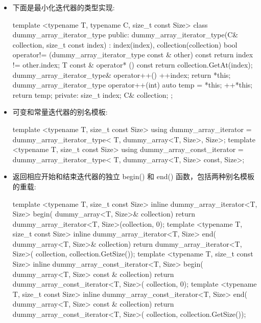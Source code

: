 \begin{itemize}
\item
下面是最小化迭代器的类型实现:

\begin{cpp}
template <typename T, typename C, size_t const Size>
class dummy_array_iterator_type
{
    public:
    dummy_array_iterator_type(C& collection,
    size_t const index) :
    index(index), collection(collection)
    { }
    bool operator!= (dummy_array_iterator_type const & other) const
    {
        return index != other.index;
    }
    T const & operator* () const
    {
        return collection.GetAt(index);
    }
    dummy_array_iterator_type& operator++()
    {
        ++index;
        return *this;
    }
    dummy_array_iterator_type operator++(int)
    {
        auto temp = *this;
        ++*this;
        return temp;
    }
    private:
    size_t   index;
    C&       collection;
};
\end{cpp}

\item
可变和常量迭代器的别名模板:

\begin{cpp}
template <typename T, size_t const Size>
using dummy_array_iterator =
    dummy_array_iterator_type<
T, dummy_array<T, Size>, Size>;
template <typename T, size_t const Size>
using dummy_array_const_iterator =
    dummy_array_iterator_type<
        T, dummy_array<T, Size> const, Size>;
\end{cpp}

\item
返回相应开始和结束迭代器的独立 begin() 和 end() 函数，包括两种别名模板的重载:

\begin{cpp}
template <typename T, size_t const Size>
inline dummy_array_iterator<T, Size> begin(
dummy_array<T, Size>& collection)
{
    return dummy_array_iterator<T, Size>(collection, 0);
}
template <typename T, size_t const Size>
inline dummy_array_iterator<T, Size> end(
dummy_array<T, Size>& collection)
{
    return dummy_array_iterator<T, Size>(
    collection, collection.GetSize());
}
template <typename T, size_t const Size>
inline dummy_array_const_iterator<T, Size> begin(
dummy_array<T, Size> const & collection)
{
    return dummy_array_const_iterator<T, Size>(
    collection, 0);
}
template <typename T, size_t const Size>
inline dummy_array_const_iterator<T, Size> end(
dummy_array<T, Size> const & collection)
{
    return dummy_array_const_iterator<T, Size>(
    collection, collection.GetSize());
}
\end{cpp}

\end{itemize}

